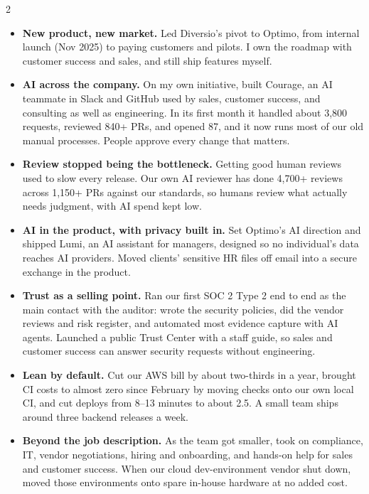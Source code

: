 \documentclass[10pt,a4paper,withhyper,ragged2e]{altacv}
\begin{document}
\begin{paracol}{2}
%
\begin{itemize}
\item \textbf{New product, new market.} Led Diversio's pivot to Optimo, from internal launch (Nov 2025) to paying customers and pilots. I own the roadmap with customer success and sales, and still ship features myself.
\item \textbf{AI across the company.} On my own initiative, built Courage, an AI teammate in Slack and GitHub used by sales, customer success, and consulting as well as engineering. In its first month it handled about 3,800 requests, reviewed 840+ PRs, and opened 87, and it now runs most of our old manual processes. People approve every change that matters.
\item \textbf{Review stopped being the bottleneck.} Getting good human reviews used to slow every release. Our own AI reviewer has done 4,700+ reviews across 1,150+ PRs against our standards, so humans review what actually needs judgment, with AI spend kept low.
\item \textbf{AI in the product, with privacy built in.} Set Optimo's AI direction and shipped Lumi, an AI assistant for managers, designed so no individual's data reaches AI providers. Moved clients' sensitive HR files off email into a secure exchange in the product.
\item \textbf{Trust as a selling point.} Ran our first SOC 2 Type 2 end to end as the main contact with the auditor: wrote the security policies, did the vendor reviews and risk register, and automated most evidence capture with AI agents. Launched a public Trust Center with a staff guide, so sales and customer success can answer security requests without engineering.
\item \textbf{Lean by default.} Cut our AWS bill by about two-thirds in a year, brought CI costs to almost zero since February by moving checks onto our own local CI, and cut deploys from 8--13 minutes to about 2.5. A small team ships around three backend releases a week.
\item \textbf{Beyond the job description.} As the team got smaller, took on compliance, IT, vendor negotiations, hiring and onboarding, and hands-on help for sales and customer success. When our cloud dev-environment vendor shut down, moved those environments onto spare in-house hardware at no added cost.

\end{itemize}
\end{paracol}
\end{document}
